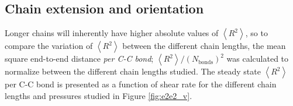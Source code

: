 \documentclass[5p]{elsarticle}
\begin{document}

\subsection{Chain extension and orientation}
\label{ext}

Longer chains will inherently have higher absolute values of $\left< R^2 \right> $, so to compare the variation of $\left< R^2 \right> $ between the different chain lengths, the mean square end-to-end distance \emph{per C-C bond}; $\left< R^2 \right>/\left(N_\text{bonds}\right)^2$ was calculated to normalize between the different chain lengths studied. The steady state $\left< R^2 \right> $ per C-C bond is presented as a function of shear rate for the different chain lengths and pressures studied in Figure \ref{fig:e2e2_v}.
\end{document}
